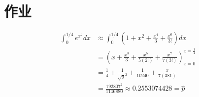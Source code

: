 \section{作业}

\begin{equation}
\begin{aligned} \int_{0}^{1 / 4} e^{x^{2}} d x & \approx \int_{0}^{1 / 4}\left(1+x^{2}+\frac{x^{4}}{3}+\frac{x^{6}}{3 !}\right) d x \\ &=\left(x+\frac{x^{3}}{3}+\frac{x^{5}}{5(2 !)}+\frac{x^{7}}{7(3 !)}\right)^{x=\frac{1}{4}}_{x=0}\\ &=\frac{1}{4}+\frac{1}{\sqrt{9}^{2}}+\frac{1}{10240}+\frac{x}{7(381)} \\ &=\frac{192807^{2}}{1146880} \approx 0.2553074428=\hat{p} \end{aligned}
\end{equation}